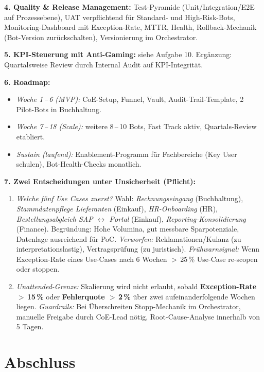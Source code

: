 \documentclass[11pt,a4paper,oneside]{article}
\begin{document}
\begin{loesungbox}
\smallskip
\textbf{4. Quality \& Release Management:} Test-Pyramide (Unit/Integration/E2E auf Prozessebene), UAT verpflichtend f\"ur Standard- und High-Risk-Bots, Monitoring-Dashboard mit Exception-Rate, MTTR, Health, Rollback-Mechanik (Bot-Version zur\"uckschalten), Versionierung im Orchestrator.

\smallskip
\textbf{5. KPI-Steuerung mit Anti-Gaming:} siehe Aufgabe 10. Erg\"anzung: Quartalsweise Review durch Internal Audit auf KPI-Integrit\"at.

\smallskip
\textbf{6. Roadmap:}
\begin{itemize}
  \item \emph{Woche 1\,--\,6 (MVP):} CoE-Setup, Funnel, Vault, Audit-Trail-Template, 2 Pilot-Bots in Buchhaltung.
  \item \emph{Woche 7\,--\,18 (Scale):} weitere 8\,--\,10 Bots, Fast Track aktiv, Quartals-Review etabliert.
  \item \emph{Sustain (laufend):} Enablement-Programm f\"ur Fachbereiche (Key User schulen), Bot-Health-Checks monatlich.
\end{itemize}

\smallskip
\textbf{7. Zwei Entscheidungen unter Unsicherheit (Pflicht):}
\begin{enumerate}
  \item \emph{Welche f\"unf Use Cases zuerst?} Wahl: \emph{Rechnungseingang} (Buchhaltung), \emph{Stammdatenpflege Lieferanten} (Einkauf), \emph{HR-Onboarding} (HR), \emph{Bestellungsabgleich SAP $\leftrightarrow$ Portal} (Einkauf), \emph{Reporting-Konsolidierung} (Finance). Begr\"undung: Hohe Volumina, gut messbare Sparpotenziale, Datenlage ausreichend f\"ur PoC. \emph{Verworfen:} Reklamationen/Kulanz (zu interpretationslastig), Vertragspr\"ufung (zu juristisch). \emph{Fr\"uhwarnsignal:} Wenn Exception-Rate eines Use-Cases nach 6 Wochen $>$\,25\,\% \textrightarrow{} Use-Case re-scopen oder stoppen.
  \item \emph{Unattended-Grenze:} Skalierung wird nicht erlaubt, sobald \textbf{Exception-Rate $>$\,15\,\%} oder \textbf{Fehlerquote $>$\,2\,\%} \"uber zwei aufeinanderfolgende Wochen liegen. \emph{Guardrails:} Bei \"Uberschreiten Stopp-Mechanik im Orchestrator, manuelle Freigabe durch CoE-Lead n\"otig, Root-Cause-Analyse innerhalb von 5 Tagen.
\end{enumerate}
\end{loesungbox}

\clearpage

\section*{Abschluss}
\thispagestyle{plain}
\end{document}
